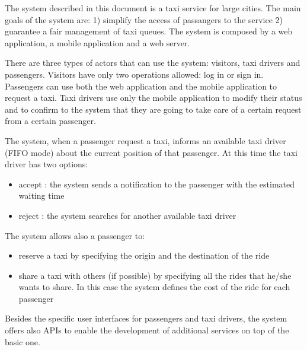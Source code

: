 The system described in this document is a taxi service for large cities.
The main goals of the system are: 1) simplify the access of passangers to the service 2) guarantee a fair management of taxi queues.
The system is composed by a web application, a mobile application and a web server.

There are three types of actors that can use the system: visitors, taxi drivers and passengers.
Visitors have only two operations allowed: log in or sign in.
Passengers can use both the web application and the mobile application to request a taxi.
Taxi drivers use only the mobile application to modify their status and to confirm to the system that they are going to take care of a certain request from a certain passenger.

The system, when a passenger request a taxi, informs an available taxi driver (FIFO mode) about the current position of that passenger. 
At this time the taxi driver has two options:
\begin{itemize}
\item accept : the system sends a notification to the passenger with the estimated waiting time
\item reject : the system searches for another available taxi driver
\end{itemize}

The system allows also a passenger to:
\begin{itemize}
\item reserve a taxi by specifying the origin and the destination of the ride
\item share a taxi with others (if possible) by specifying all the rides that he/she wants to share. In this case the system defines the cost of the ride for each passenger
\end{itemize}

Besides the specific user interfaces for passengers and taxi drivers, the system offers also APIs to enable the development of additional services on top of the basic one.